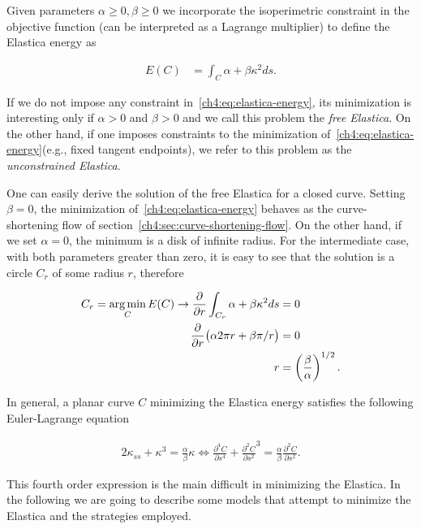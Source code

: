 Given parameters $\alpha \geq 0, \beta \geq 0$ we incorporate the isoperimetric constraint in the objective function (can be interpreted as a Lagrange multiplier) to define the Elastica energy as

\begin{align}
	E(C) &= \int_{C}{\alpha + \beta \kappa^2 ds}.
	\label{ch4:eq:elastica-energy}
\end{align}

If we do not impose any constraint in~\cref{ch4:eq:elastica-energy}, its minimization is interesting only if $\alpha >0$ and $\beta >0$ and we call this problem the \emph{free Elastica}. On the other hand, if one imposes constraints to the minimization of~\cref{ch4:eq:elastica-energy}(e.g., fixed tangent endpoints), we refer to this problem as the \emph{unconstrained Elastica}.

One can easily derive the solution of the free Elastica for a closed curve. Setting $\beta=0$, the minimization of~\cref{ch4:eq:elastica-energy} behaves as the curve-shortening flow of section~\cref{ch4:sec:curve-shortening-flow}. On the other hand, if we set $\alpha =0$, the minimum is a disk of infinite radius. For the intermediate case, with both parameters greater than zero, it is easy to see that the solution is a circle $C_r$ of some radius $r$, therefore

\begin{align*}
	C_r = \operatorname*{arg\,min}_C E(C) \rightarrow \frac{ \partial}{\partial r} \int_{C_r}{\alpha + \beta \kappa^2 ds} &= 0 \\
	\frac{\partial}{\partial r} \big( \alpha 2\pi r + \beta \pi/r \big) & = 0 \\
	r &= \left(\frac{\beta}{\alpha}\right)^{1/2}.
\end{align*}

In general, a planar curve $C$ minimizing the Elastica energy satisfies the following Euler-Lagrange equation~\cite{chan02elasticainpainting,singer08lectures}

\begin{align}
		2\kappa_{ss} + \kappa^3 = \frac{\alpha}{\beta}\kappa \Leftrightarrow \frac{\partial ^4 C}{\partial s^4} + \frac{\partial ^2 C}{\partial s^2}^3 = \frac{\alpha}{\beta}\frac{\partial ^2 C}{\partial s^2}.
		\label{ch4:eq:euler-lagrange-equation-elastica}
\end{align}


This fourth order expression is the main difficult in minimizing the Elastica. In the following we are going to describe some models that attempt to minimize the Elastica and the strategies employed.

